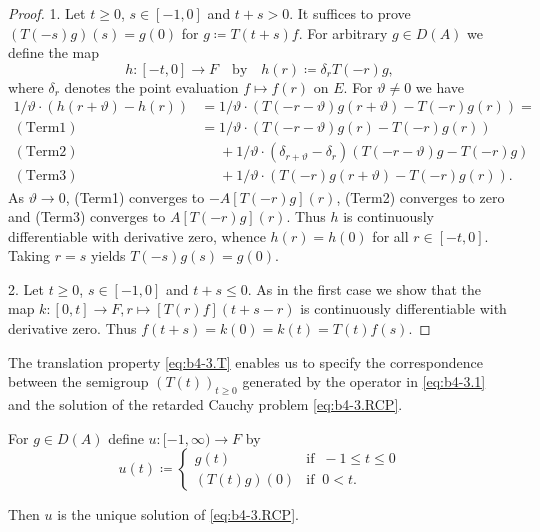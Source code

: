 \begin{proof}
1. Let $t \geq 0$, $s \in [-1,0]$ and $t+s  >  0$.
It suffices to prove $(T(-s)g)(s) = g(0)$ for $g  \coloneq  T(t+s)f$.
For arbitrary $g \in D(A)$ we define the map
\[
h : [-t,0] \to F \quad \text{by} \quad h(r) \coloneq  \delta_{r}T(-r)g ,
\]
where $\delta_{r}$ denotes the point evaluation $f \mapsto f(r)$ on $E$.
For $\vartheta \neq 0$ we have
\begin{align*}
	1/\vartheta\cdot(h(r+\vartheta) - h(r)) & = 1/\vartheta\cdot(T(-r-\vartheta)g(r+\vartheta) - T(-r)g(r)) =\\
	(\mathrm{Term1})\quad  &= 1/\vartheta\cdot(T(-r-\vartheta)g(r) - T(-r)g(r)) \\
	(\mathrm{Term2})\quad  &\phantom{= }  + 1/\vartheta\cdot(\delta_{r+\vartheta} - \delta_{r})(T(-r-\vartheta)g - T(-r)g) \\
	(\mathrm{Term3})\quad &\phantom{= }  + 1/\vartheta\cdot(T(-r)g(r+\vartheta) - T(-r)g(r)).
\end{align*}
As $\vartheta \to 0$, (Term1) converges to $-A[T(-r)g](r)$, (Term2) converges to zero and (Term3) converges to $A[T(-r)g](r)$.
Thus $h$ is continuously differentiable with derivative zero, whence $h(r) = h(0)$ for all $r \in [-t,0]$.
Taking $r = s$ yields $T(-s)g(s) = g(0)$.

2. Let $t \geq 0$, $s \in [-1,0]$ and $t+s \leq 0$.
As in the first case we show that the map $k : [0,t] \to F , r \mapsto [T(r)f](t+s-r)$ is continuously differentiable with derivative zero.
Thus $f(t+s) = k(0) = k(t) = T(t)f(s)$.
\end{proof}
The translation property \eqref{eq:b4-3.T} enables us to specify the correspondence between the semigroup $(T(t))_{t\geq 0}$ generated by the operator in \eqref{eq:b4-3.1} and the solution of the retarded Cauchy problem \eqref{eq:b4-3.RCP}.
\begin{corollary}\label{cor:b4-3.2}
	For $g \in D(A)$ define $u : [-1,\infty) \to F$ by
	\[u(t)  \coloneq  \begin{cases}
		g(t) & \text{if } \ -1 \leq t \leq 0 \\
		(T(t)g)(0) & \text{if } \ 0 < t.
	\end{cases}\]
	
	Then $u$ is the unique solution of \eqref{eq:b4-3.RCP}.
\end{corollary}
